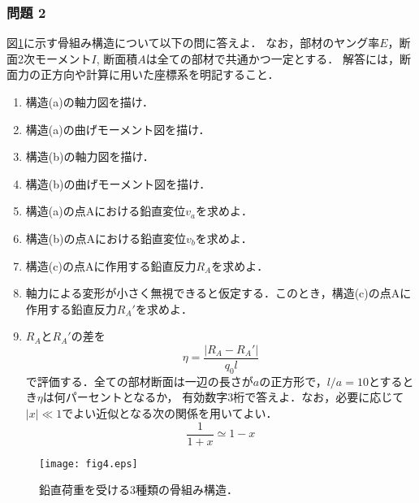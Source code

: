 \documentclass[10pt,a4j]{jarticle}
\begin{document}
\subsubsection*{問題 2}
図\ref{fig:fig4}に示す骨組み構造について以下の問に答えよ． 
なお，部材のヤング率$E$，断面2次モーメント$I$, 断面積$A$は全ての部材で共通かつ一定とする．
解答には，断面力の正方向や計算に用いた座標系を明記すること．
\begin{enumerate}
\item
	構造(a)の軸力図を描け．
\item
	構造(a)の曲げモーメント図を描け．
\item
	構造(b)の軸力図を描け．
\item
	構造(b)の曲げモーメント図を描け．
\item
	構造(a)の点Aにおける鉛直変位$v_a$を求めよ．
\item
	構造(b)の点Aにおける鉛直変位$v_b$を求めよ．
\item
	構造(c)の点Aに作用する鉛直反力$R_A$を求めよ．
\item
	軸力による変形が小さく無視できると仮定する．このとき，構造(c)の点Aに作用する鉛直反力$R_A'$を求めよ．
\item
	$R_A$と$R_A'$の差を
	\begin{equation}
		\eta =\frac{|R_A-R_A'|}{q_0l}
		\label{eqn:}
	\end{equation}
	で評価する．全ての部材断面は一辺の長さが$a$の正方形で，$l/a=10$とするとき$\eta$は何パーセントとなるか，
	有効数字3桁で答えよ．なお，必要に応じて$|x|\ll 1$でよい近似となる次の関係を用いてよい．
	\begin{equation}
		\frac{1}{1+x}\simeq 1-x
	\label{eqn:}
	\end{equation}
\end{enumerate}
\begin{figure}[h]
	\begin{center}
	\texttt{[image: fig4.eps]} 
	\end{center}
	\caption{鉛直荷重を受ける3種類の骨組み構造．} 
	\label{fig:fig4}
\end{figure}
\end{document}
